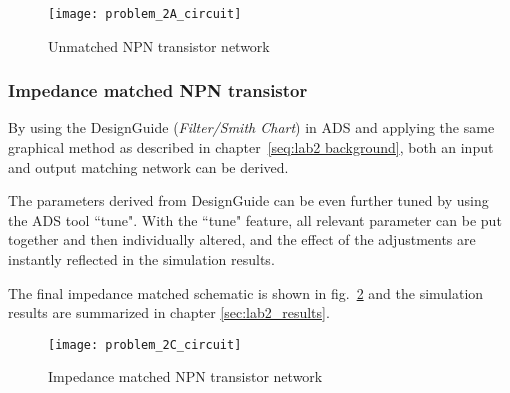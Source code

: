 \documentclass[report.tex]{subfiles}
\begin{document}
\begin{figure}[h]
    \centering
    \texttt{[image: problem\_2A\_circuit]}
    \caption{Unmatched NPN transistor network}
    \label{fig:problem 2A circuit}
\end{figure}

\subsubsection{Impedance matched NPN transistor}
By using the DesignGuide (\emph{Filter/Smith Chart}) in ADS and applying the same graphical method as described in chapter~\ref{seq:lab2 background}, both an input and output matching network can be derived.

The parameters derived from DesignGuide can be even further tuned by using the ADS tool ``tune". With the ``tune" feature, all relevant parameter can be put together and then individually altered, and the effect of the adjustments are instantly reflected in the simulation results.

The final impedance matched schematic is shown in fig.~\ref{fig:problem 2C circuit} and the simulation results are summarized in chapter \ref{sec:lab2_results}.

\begin{figure}[h]
    \centering
    \texttt{[image: problem\_2C\_circuit]}
    \caption{Impedance matched NPN transistor network}
    \label{fig:problem 2C circuit}
\end{figure}
\end{document}
